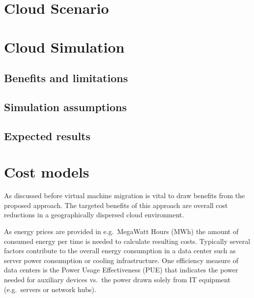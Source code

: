 

\section{Cloud Scenario}

%
%
%
%


\section{Cloud Simulation}

\subsection{Benefits and limitations}

\subsection{Simulation assumptions}

\subsection{Expected results}




\section{Cost models}

As discussed before virtual machine migration is vital to draw benefits from the proposed approach. The targeted benefits of this approach are overall cost reductions in a geographically dispersed cloud environment. 

As energy prices are provided in e.g.~MegaWatt Hours (MWh) the amount of consumed energy per time is needed to calculate resulting costs. Typically several factors contribute to the overall energy consumption in a data center such as server power consumption or cooling infrastructure. One efficiency measure of data centers is the Power Usage Effectiveness (PUE) that indicates the power needed for auxiliary devices vs.~the power drawn solely from IT equipment (e.g.~servers or network hubs). 

